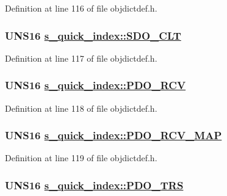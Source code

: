 Definition at line 116 of file objdictdef.h.\hypertarget{structs__quick__index_6224504249d0fd33d8dd09d874c92ace}{
\subsubsection[SDO\_\-CLT]{\setlength{\rightskip}{0pt plus 5cm}UNS16 \hyperlink{structs__quick__index_6224504249d0fd33d8dd09d874c92ace}{s\_\-quick\_\-index::SDO\_\-CLT}}}
\label{structs__quick__index_6224504249d0fd33d8dd09d874c92ace}




Definition at line 117 of file objdictdef.h.\hypertarget{structs__quick__index_cadbae6acd5ded4e8eebf0ce88c2ec55}{
\subsubsection[PDO\_\-RCV]{\setlength{\rightskip}{0pt plus 5cm}UNS16 \hyperlink{structs__quick__index_cadbae6acd5ded4e8eebf0ce88c2ec55}{s\_\-quick\_\-index::PDO\_\-RCV}}}
\label{structs__quick__index_cadbae6acd5ded4e8eebf0ce88c2ec55}




Definition at line 118 of file objdictdef.h.\hypertarget{structs__quick__index_9a83f9efff533e71d580fda6118b101e}{
\subsubsection[PDO\_\-RCV\_\-MAP]{\setlength{\rightskip}{0pt plus 5cm}UNS16 \hyperlink{structs__quick__index_9a83f9efff533e71d580fda6118b101e}{s\_\-quick\_\-index::PDO\_\-RCV\_\-MAP}}}
\label{structs__quick__index_9a83f9efff533e71d580fda6118b101e}




Definition at line 119 of file objdictdef.h.\hypertarget{structs__quick__index_48e0ba31ff7746f1fa63f240a132a906}{
\subsubsection[PDO\_\-TRS]{\setlength{\rightskip}{0pt plus 5cm}UNS16 \hyperlink{structs__quick__index_48e0ba31ff7746f1fa63f240a132a906}{s\_\-quick\_\-index::PDO\_\-TRS}}}
\label{structs__quick__index_48e0ba31ff7746f1fa63f240a132a906}




